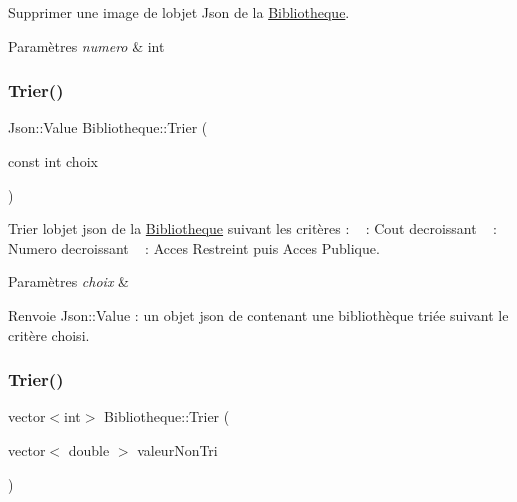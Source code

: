 Supprimer une image de l\textquotesingle{}objet Json de la \hyperlink{classBibliotheque}{Bibliotheque}. 


\begin{DoxyParams}{Paramètres}
{\em numero} & int \\
\hline
\end{DoxyParams}
\mbox{\label{classBibliotheque_aa06803a5d680126cdbddbe4e1ab9395c}} 
\subsubsection{\texorpdfstring{Trier()}{Trier()}\hspace{0.1cm}{\footnotesize\ttfamily [1/4]}}
{\footnotesize\ttfamily Json\+::\+Value Bibliotheque\+::\+Trier (\begin{DoxyParamCaption}\item[{const int}]{choix }\end{DoxyParamCaption})}



Trier l\textquotesingle{}objet json de la \hyperlink{classBibliotheque}{Bibliotheque} suivant les critères \+: ~ \+: Cout decroissant ~ \+: Numero decroissant ~ \+: Acces Restreint puis Acces Publique. 


\begin{DoxyParams}{Paramètres}
{\em choix} & \\
\hline
\end{DoxyParams}
\begin{DoxyReturn}{Renvoie}
Json\+::\+Value \+: un objet json de contenant une bibliothèque triée suivant le critère choisi. 
\end{DoxyReturn}
\mbox{\label{classBibliotheque_ad62c3fc7fd3829a0634a22ad98aa9332}} 
\subsubsection{\texorpdfstring{Trier()}{Trier()}\hspace{0.1cm}{\footnotesize\ttfamily [2/4]}}
{\footnotesize\ttfamily vector$<$int$>$ Bibliotheque\+::\+Trier (\begin{DoxyParamCaption}\item[{vector$<$ double $>$}]{valeur\+Non\+Tri }\end{DoxyParamCaption})}




